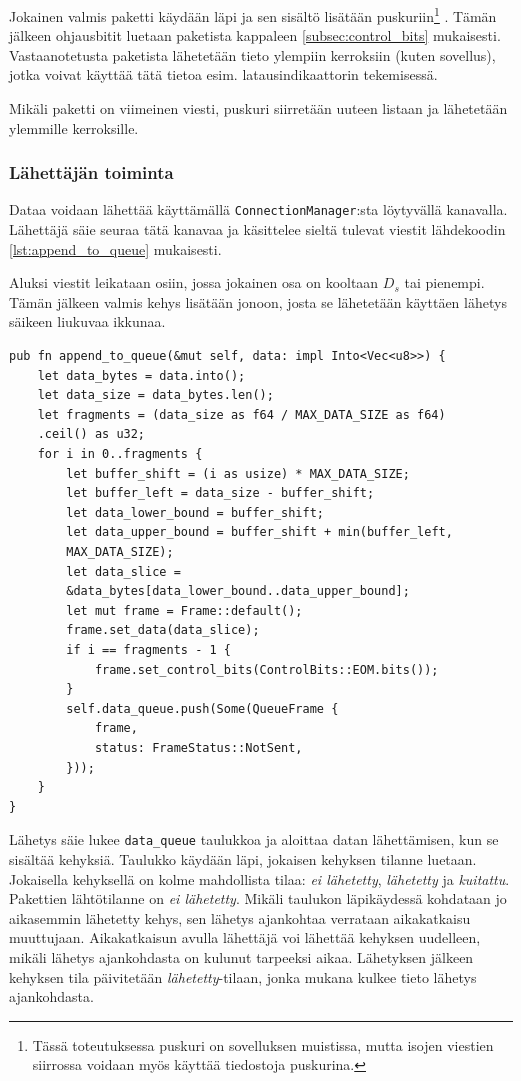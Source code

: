 \documentclass[a4paper,12pt]{article}
\begin{document}
    Jokainen valmis paketti käydään läpi ja sen sisältö lisätään puskuriin\footnote{Tässä toteutuksessa puskuri on sovelluksen muistissa, mutta isojen viestien siirrossa voidaan myös käyttää tiedostoja puskurina.}
    . Tämän jälkeen ohjausbitit luetaan paketista kappaleen \ref{subsec:control_bits} mukaisesti. Vastaanotetusta paketista lähetetään tieto ylempiin kerroksiin (kuten sovellus), jotka voivat käyttää tätä tietoa esim. latausindikaattorin tekemisessä. \par

    Mikäli paketti on viimeinen viesti, puskuri siirretään uuteen listaan ja lähetetään ylemmille kerroksille.

    \subsubsection{Lähettäjän toiminta}\label{subsec:sender_impl}
    Dataa voidaan lähettää käyttämällä \lstinline{ConnectionManager}:sta löytyvällä kanavalla. Lähettäjä säie seuraa tätä kanavaa ja käsittelee sieltä tulevat viestit lähdekoodin \ref{lst:append_to_queue} mukaisesti. \par

    Aluksi viestit leikataan osiin, jossa jokainen osa on kooltaan $D_s$ tai pienempi. Tämän jälkeen valmis kehys lisätään jonoon, josta se lähetetään käyttäen lähetys säikeen liukuvaa ikkunaa.
    
    \begin{lstlisting}[caption={Datan käsittely lähettämistä varten}, label={lst:append_to_queue}]
pub fn append_to_queue(&mut self, data: impl Into<Vec<u8>>) {
    let data_bytes = data.into();
    let data_size = data_bytes.len();
    let fragments = (data_size as f64 / MAX_DATA_SIZE as f64)
    .ceil() as u32;
    for i in 0..fragments {
        let buffer_shift = (i as usize) * MAX_DATA_SIZE;
        let buffer_left = data_size - buffer_shift;
        let data_lower_bound = buffer_shift;
        let data_upper_bound = buffer_shift + min(buffer_left,
        MAX_DATA_SIZE);
        let data_slice =
        &data_bytes[data_lower_bound..data_upper_bound];
        let mut frame = Frame::default();
        frame.set_data(data_slice);
        if i == fragments - 1 {
            frame.set_control_bits(ControlBits::EOM.bits());
        }
        self.data_queue.push(Some(QueueFrame {
            frame,
            status: FrameStatus::NotSent,
        }));
    }
}
\end{lstlisting}
 
Lähetys säie lukee \lstinline{data_queue} taulukkoa ja aloittaa datan lähettämisen, kun se sisältää kehyksiä. Taulukko käydään läpi, jokaisen kehyksen tilanne luetaan. Jokaisella kehyksellä on kolme mahdollista tilaa: \textit{ei lähetetty}, \textit{lähetetty} ja \textit{kuitattu}. Pakettien lähtötilanne on \textit{ei lähetetty}. Mikäli taulukon läpikäydessä kohdataan jo aikasemmin lähetetty kehys, sen lähetys ajankohtaa verrataan aikakatkaisu muuttujaan. Aikakatkaisun avulla lähettäjä voi lähettää kehyksen uudelleen, mikäli lähetys ajankohdasta on kulunut tarpeeksi aikaa. Lähetyksen jälkeen kehyksen tila päivitetään \textit{lähetetty}-tilaan, jonka mukana kulkee tieto lähetys ajankohdasta. \par
\end{document}
